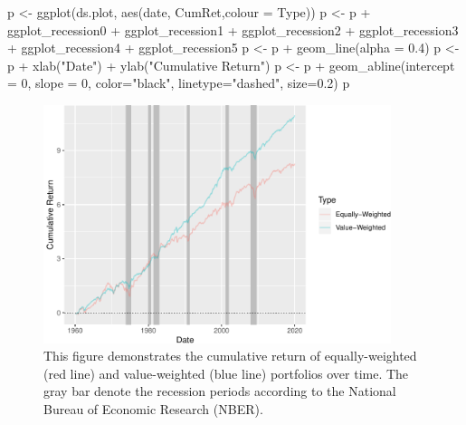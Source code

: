 \begin{Schunk}
\begin{Sinput}
p <- ggplot(ds.plot, aes(date, CumRet,colour = Type))
p <- p +  ggplot_recession0 + ggplot_recession1 + 
  ggplot_recession2 + ggplot_recession3 +
  ggplot_recession4 + ggplot_recession5
p <- p + geom_line(alpha = 0.4)
p <- p + xlab("Date") + ylab("Cumulative Return")
p <- p + geom_abline(intercept = 0, slope = 0, color="black",  linetype="dashed", size=0.2)
p
\end{Sinput}
\begin{figure}
\caption{This figure demonstrates the cumulative return of equally-weighted (red line) and value-weighted (blue line) portfolios over time. The gray bar denote the recession periods according to the National Bureau of Economic Research (NBER).}
\begin{center}
\includegraphics[width = 4in]{CRSP_COMP_files/figure-latex/unnamed-chunk-12-1}
\end{center}
\end{figure}

\end{Schunk}

